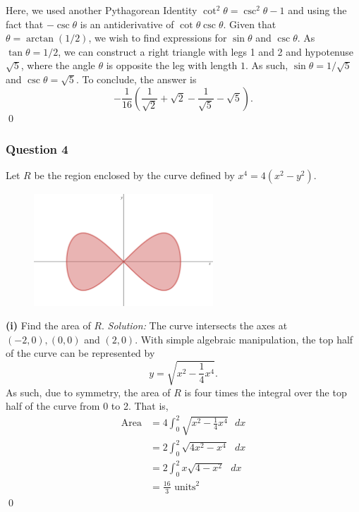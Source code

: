 \documentclass{article}
\begin{document}
Here, we used another Pythagorean Identity $\operatorname{cot}^2\theta=\operatorname{csc}^2\theta-1$ and using the fact that $-\operatorname{csc}\theta$ is an antiderivative of $\operatorname{cot}\theta\operatorname{csc}\theta$.
\newline
\newline Given that $\theta=\operatorname{arctan}(1/2)$, we wish to find expressions for $\operatorname{sin}\theta$ and $\operatorname{csc}\theta$. As $\operatorname{tan}\theta=1/2$, we can construct a right triangle with legs 1 and 2 and hypotenuse $\sqrt{5}$, where the angle $\theta$ is opposite the leg with length $1$. As such, $\operatorname{sin}\theta=1/\sqrt{5}$ and $\operatorname{csc}\theta=\sqrt{5}$. To conclude, the answer is \[-\frac{1}{16}\left(\frac{1}{\sqrt{2}}+\sqrt{2}-\frac{1}{\sqrt{5}}-\sqrt{5}\right).\] \qed 
\newpage
\subsubsection*{Question 4}
Let $R$ be the region enclosed by the curve defined by $x^4=4(x^2-y^2)$.
\begin{figure}[h!]
\centering
\includegraphics[width=0.6\textwidth]{Polar.png}
\end{figure}
\newblock\newline\textbf{(i)} Find the area of $R$.
\newline
\newline\textit{Solution:} The curve intersects the axes at $(-2,0), (0,0)$ and $(2,0)$. With simple algebraic manipulation, the top half of the curve can be represented by \[y=\sqrt{x^2-\frac{1}{4}x^4}.\] As such, due to symmetry, the area of $R$ is four times the integral over the top half of the curve from 0 to 2. That is, \begin{align*}
    \text{Area}&=4\int_{0}^{2}\sqrt{x^2-\frac{1}{4}x^4}\text{ }dx\\
    &=2\int_{0}^{2}\sqrt{4x^2-x^4}\text{ }dx\\
    &=2\int_{0}^{2}x\sqrt{4-x^2}\text{ }dx\\
    &=\frac{16}{3}\text{ units}^2
\end{align*}\qed
\end{document}
